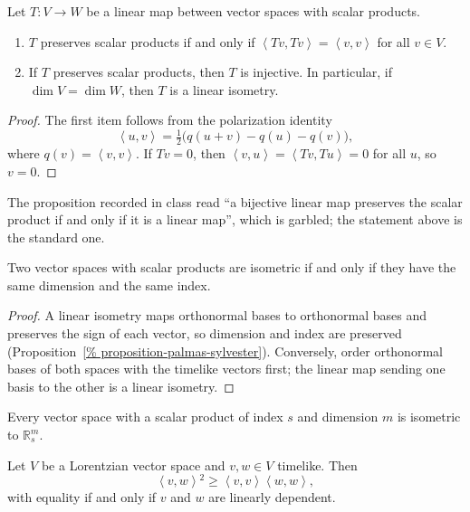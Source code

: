 \begin{proposition}
\label{proposition-palmas-polarization}
Let $T\colon V\to W$ be a linear map
between vector spaces with scalar products.
\begin{enumerate}
\item $T$ preserves scalar products if and
only if
$\left\langle{} Tv,Tv \right\rangle{}
=\left\langle{} v,v \right\rangle{}$
for all $v\in V$.
\item If $T$ preserves scalar products,
then $T$ is injective. In particular, if
$\dim V=\dim W$, then $T$ is a linear
isometry.
\end{enumerate}
\end{proposition}

\begin{proof}
The first item follows from the
polarization identity
$$
\left\langle{} u,v \right\rangle{}
=\tfrac{1}{2}\big(q(u+v)-q(u)-q(v)\big),
$$
where
$q(v)=\left\langle{} v,v \right\rangle{}$.
If $Tv=0$, then
$\left\langle{} v,u \right\rangle{}
=\left\langle{} Tv,Tu \right\rangle{}=0$
for all $u$, so $v=0$.
\end{proof}

The proposition recorded in class read ``a
bijective linear map preserves the scalar
product if and only if it is a linear
map'', which is garbled; the statement
above is the standard one.

\begin{theorem}
\label{theorem-palmas-isometric-spaces}
Two vector spaces with scalar products are
isometric if and only if they have the same
dimension and the same index.
\end{theorem}

\begin{proof}
A linear isometry maps orthonormal bases to
orthonormal bases and preserves the sign of
each vector, so dimension and index are
preserved
(Proposition~\ref{%
proposition-palmas-sylvester}).
Conversely, order orthonormal bases of both
spaces with the timelike vectors first;
the linear map sending one basis to the
other is a linear isometry.
\end{proof}

\begin{corollary}
\label{corollary-palmas-standard-model}
Every vector space with a scalar product of
index $s$ and dimension $m$ is isometric to
$\mathbb{R}^m_s$.
\end{corollary}

\begin{proposition}
\label{proposition-palmas-reverse-cs}
Let $V$ be a Lorentzian vector space and
$v,w\in V$ timelike. Then
$$
\left\langle{} v,w \right\rangle{}^2
\geq\left\langle{} v,v \right\rangle{}
\left\langle{} w,w \right\rangle{},
$$
with equality if and only if $v$ and $w$
are linearly dependent.
\end{proposition}

